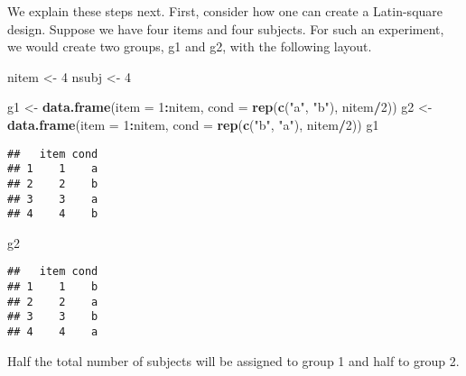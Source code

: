 \documentclass[12pt,]{krantz}
\newenvironment{Shaded}{\begin{snugshade}}{\end{snugshade}}
\newcommand{\CommentTok}[1]{\textcolor[rgb]{0.56,0.35,0.01}{\textit{#1}}}
\newcommand{\DataTypeTok}[1]{\textcolor[rgb]{0.13,0.29,0.53}{#1}}
\newcommand{\DecValTok}[1]{\textcolor[rgb]{0.00,0.00,0.81}{#1}}
\newcommand{\KeywordTok}[1]{\textcolor[rgb]{0.13,0.29,0.53}{\textbf{#1}}}
\newcommand{\NormalTok}[1]{#1}
\newcommand{\OperatorTok}[1]{\textcolor[rgb]{0.81,0.36,0.00}{\textbf{#1}}}
\newcommand{\StringTok}[1]{\textcolor[rgb]{0.31,0.60,0.02}{#1}}
\begin{document}
We explain these steps next. First, consider how one can create a Latin-square design. Suppose we have four items and four subjects. For such an experiment, we would create two groups, g1 and g2, with the following layout.

\begin{Shaded}
\begin{Highlighting}[]
\NormalTok{nitem <-}\StringTok{ }\DecValTok{4}
\NormalTok{nsubj <-}\StringTok{ }\DecValTok{4}

\NormalTok{g1 <-}\StringTok{ }\KeywordTok{data.frame}\NormalTok{(}\DataTypeTok{item =} \DecValTok{1}\OperatorTok{:}\NormalTok{nitem, }\DataTypeTok{cond =} \KeywordTok{rep}\NormalTok{(}\KeywordTok{c}\NormalTok{(}\StringTok{"a"}\NormalTok{, }
  \StringTok{"b"}\NormalTok{), nitem}\OperatorTok{/}\DecValTok{2}\NormalTok{))}
\NormalTok{g2 <-}\StringTok{ }\KeywordTok{data.frame}\NormalTok{(}\DataTypeTok{item =} \DecValTok{1}\OperatorTok{:}\NormalTok{nitem, }\DataTypeTok{cond =} \KeywordTok{rep}\NormalTok{(}\KeywordTok{c}\NormalTok{(}\StringTok{"b"}\NormalTok{, }
  \StringTok{"a"}\NormalTok{), nitem}\OperatorTok{/}\DecValTok{2}\NormalTok{))}
\NormalTok{g1}
\end{Highlighting}
\end{Shaded}

\begin{verbatim}
##   item cond
## 1    1    a
## 2    2    b
## 3    3    a
## 4    4    b
\end{verbatim}

\begin{Shaded}
\begin{Highlighting}[]
\NormalTok{g2}
\end{Highlighting}
\end{Shaded}

\begin{verbatim}
##   item cond
## 1    1    b
## 2    2    a
## 3    3    b
## 4    4    a
\end{verbatim}

Half the total number of subjects will be assigned to group 1 and half to group 2.

\begin{Shaded}
\end{Shaded}
\end{document}
